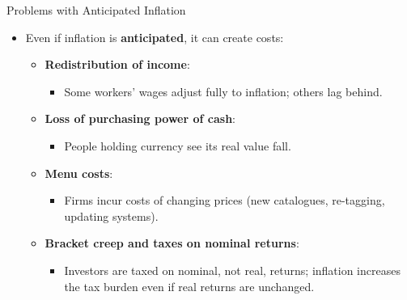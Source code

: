 \documentclass[aspectratio=169]{beamer}
\begin{document}
\begin{frame}{Problems with Anticipated Inflation}
\transfade
\begin{itemize}[<+->]
  \item Even if inflation is \textbf{anticipated}, it can create costs:
  \begin{itemize}[<+->]
    \item \textbf{Redistribution of income}:
    \begin{itemize}[<+->]
      \item Some workers’ wages adjust fully to inflation; others lag behind.
    \end{itemize}
    \item \textbf{Loss of purchasing power of cash}:
    \begin{itemize}[<+->]
      \item People holding currency see its real value fall.
    \end{itemize}
    \item \textbf{Menu costs}:
    \begin{itemize}[<+->]
      \item Firms incur costs of changing prices (new catalogues, re-tagging, updating systems).
    \end{itemize}
    \item \textbf{Bracket creep and taxes on nominal returns}:
    \begin{itemize}[<+->]
      \item Investors are taxed on nominal, not real, returns; inflation increases the tax burden even if real returns are unchanged.
    \end{itemize}
  \end{itemize}
\end{itemize}
\end{frame}
\end{document}
